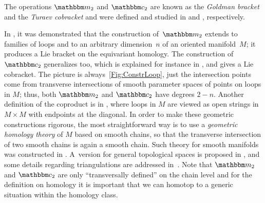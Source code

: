 \documentclass[\MainFolder/Text.tex]{subfiles}
\begin{document}
The operations $\StringOp_2$ and $\StringCoOp_2$ are known as the \emph{Goldman bracket} and the \emph{Turaev cobracket} and were defined and studied in \cite{Goldman1986} and \cite{Turaev1991}, respectively.

In \cite{Sullivan1999}, it was demonstrated that the construction of~$\StringOp_2$ extends to families of loops and to an arbitrary dimension~$n$ of an oriented manifold~$M$; it produces a Lie bracket on the equivariant homology. The construction of $\StringCoOp_2$ generalizes too, which is explained for instance in \cite{Cieliebak2007}, and gives a Lie cobracket. The picture is always~\ref{Fig:ConstrLoop}, just the intersection points come from transverse intersections of smooth parameter spaces of points on loops in $M$; thus, both $\StringOp_2$ and $\StringCoOp_2$ have degrees $2-n$. Another definition of the coproduct is in \cite{Basu2011}, where loops in $M$ are viewed as open strings in $M\times M$ with endpoints at the diagonal. In order to make these geometric constructions rigorous, the most straightforward way is to use a \emph{geometric homology theory} of $M$ based on smooth chains, so that the transverse intersection of two smooth chains is again a smooth chain. Such theory for smooth manifolds was constructed in \cite{Lipyanskiy2014}. A~version for general topological spaces is proposed in \cite{Cieliebak2013}, and some details regarding triangulations are addressed in~\cite{Hajek2014}. Note that $\StringOp_2$ and $\StringCoOp_2$ are only ``transversally defined'' on the chain level and for the definition on homology it is important that we can homotop to a generic situation within the homology class.
\end{document}
